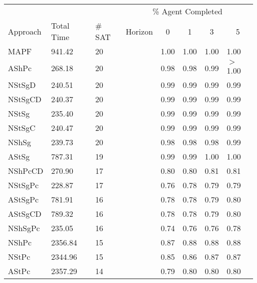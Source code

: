 \begin{table}[H]
    \begin{center}
    \begin{tabular}{@{}llllllll@{}}
    \toprule
     &  &  & \multicolumn{5}{c}{\% Agent Completed} \\ \cmidrule(l){4-8} 
    \multirow{-2}{*}{Approach} & \multirow{-2}{*}{Total Time} & \multirow{-2}{*}{\# SAT} & \multicolumn{1}{l|}{Horizon} & \multicolumn{1}{c}{0} & \multicolumn{1}{c}{1} & \multicolumn{1}{c}{3} & \multicolumn{1}{c}{5} \\ \midrule
    MAPF & 941.42 & 20 & \cellcolor{lightgrey} & 1.00 & 1.00 & 1.00 & 1.00  \\
    AShPc & 268.18 & 20 & \cellcolor{lightgrey} & 0.98 & 0.98 & 0.99 & \(>\)1.00  \\
    NStSgD & 240.51 & 20 & \cellcolor{lightgrey} & 0.99 & 0.99 & 0.99 & 0.99  \\
    NStSgCD & 240.37 & 20 & \cellcolor{lightgrey} & 0.99 & 0.99 & 0.99 & 0.99  \\
    NStSg & 235.40 & 20 & \cellcolor{lightgrey} & 0.99 & 0.99 & 0.99 & 0.99  \\
    NStSgC & 240.47 & 20 & \cellcolor{lightgrey} & 0.99 & 0.99 & 0.99 & 0.99  \\
    NShSg & 239.73 & 20 & \cellcolor{lightgrey} & 0.98 & 0.98 & 0.98 & 0.99  \\
    AStSg & 787.31 & 19 & \cellcolor{lightgrey} & 0.99 & 0.99 & 1.00 & 1.00  \\
    NShPcCD & 270.90 & 17 & \cellcolor{lightgrey} & 0.80 & 0.80 & 0.81 & 0.81  \\
    NStSgPc & 228.87 & 17 & \cellcolor{lightgrey} & 0.76 & 0.78 & 0.79 & 0.79  \\
    AStSgPc & 781.91 & 16 & \cellcolor{lightgrey} & 0.78 & 0.78 & 0.79 & 0.80  \\
    AStSgCD & 789.32 & 16 & \cellcolor{lightgrey} & 0.78 & 0.78 & 0.79 & 0.80  \\
    NShSgPc & 235.05 & 16 & \cellcolor{lightgrey} & 0.74 & 0.76 & 0.76 & 0.78  \\
    NShPc & 2356.84 & 15 & \cellcolor{lightgrey} & 0.87 & 0.88 & 0.88 & 0.88  \\
    NStPc & 2344.96 & 15 & \cellcolor{lightgrey} & 0.85 & 0.86 & 0.87 & 0.87  \\
    AStPc & 2357.29 & 14 & \cellcolor{lightgrey} & 0.79 & 0.80 & 0.80 & 0.80  \\
    \end{tabular}
    \end{center}
    \end{table}
\subsection{}